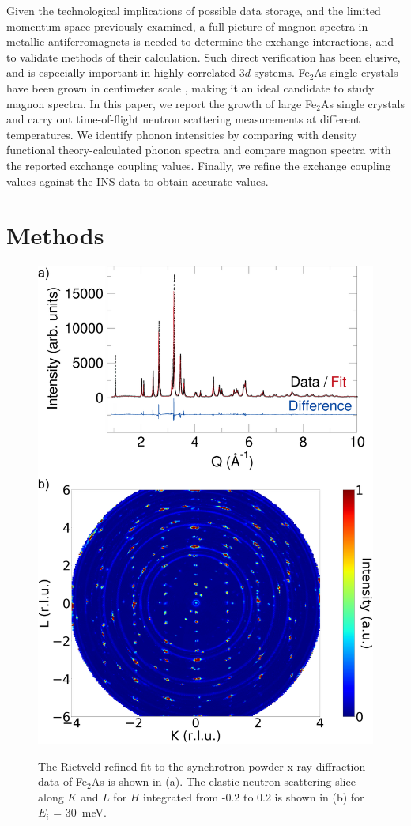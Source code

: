 \documentclass[10pt,doublespacing,edeposit]{uiucthesis2020}
\begin{document}
\begin{mainmatter}
Given the technological implications of possible data storage, and the limited momentum space previously examined, a full picture of magnon spectra in metallic antiferromagnets is needed to determine the exchange interactions, and to validate methods of their calculation. Such direct verification has been elusive, and is especially important in highly-correlated 3$d$ systems.
Fe$_2$As single crystals have been grown in centimeter scale \cite{Katsuraki1966},  making it an ideal candidate to study magnon spectra. In this paper, we report the growth of large Fe$_2$As single crystals and carry out time-of-flight neutron scattering measurements at different temperatures. We identify phonon intensities by comparing with density functional theory-calculated phonon spectra and compare magnon spectra with the reported exchange coupling values. Finally, we refine the exchange coupling values against the INS data to obtain accurate values.


\section{Methods}

\begin{figure}
\centering\includegraphics[width=0.65\columnwidth]{figures/ch8/11BM_refinement_elastic_slice.png} \\
\caption{\label{fig:photo_11_BM}
The Rietveld-refined fit to the synchrotron powder x-ray diffraction data of Fe$_2$As is shown in (a). 
The elastic neutron scattering slice along $K$ and $L$ for $H$ integrated from -0.2 to 0.2 is shown in (b) for $E_i$ = 30~meV. 
}


\end{figure}
\end{mainmatter}
\end{document}
